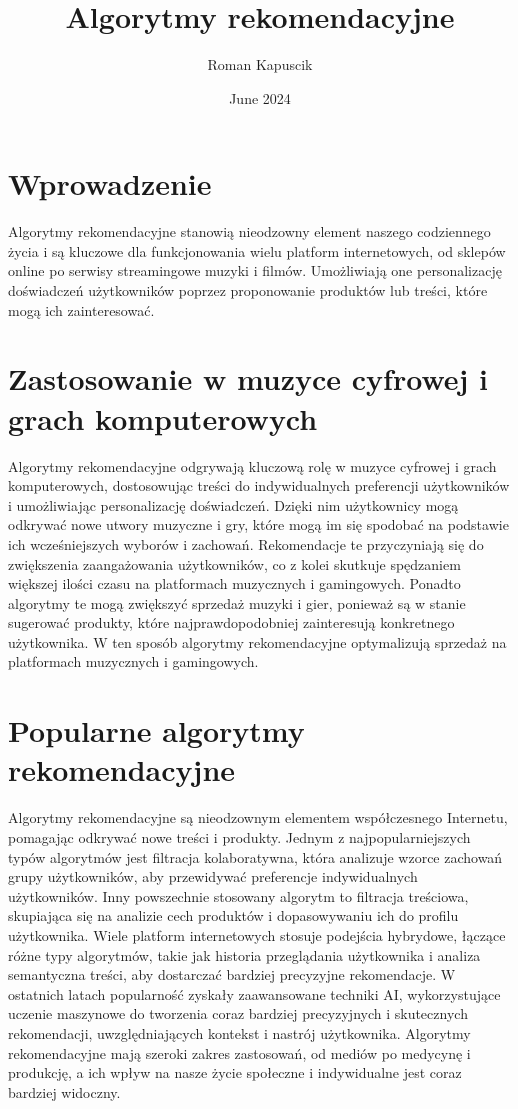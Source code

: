 \documentclass{article}
\title{Algorytmy rekomendacyjne}
\author{Roman Kapuscik}
\date{June 2024}
\begin{document}
\maketitle

\section{Wprowadzenie}
Algorytmy rekomendacyjne stanowią nieodzowny element naszego codziennego życia i są kluczowe dla funkcjonowania wielu platform internetowych, od sklepów online po serwisy streamingowe muzyki i filmów. Umożliwiają one personalizację doświadczeń użytkowników poprzez proponowanie produktów lub treści, które mogą ich zainteresować.

\section{Zastosowanie w muzyce cyfrowej i grach komputerowych}
Algorytmy rekomendacyjne odgrywają kluczową rolę w muzyce cyfrowej i grach komputerowych, dostosowując treści do indywidualnych preferencji użytkowników i umożliwiając personalizację doświadczeń. Dzięki nim użytkownicy mogą odkrywać nowe utwory muzyczne i gry, które mogą im się spodobać na podstawie ich wcześniejszych wyborów i zachowań.
Rekomendacje te przyczyniają się do zwiększenia zaangażowania użytkowników, co z kolei skutkuje spędzaniem większej ilości czasu na platformach muzycznych i gamingowych. Ponadto algorytmy te mogą zwiększyć sprzedaż muzyki i gier, ponieważ są w stanie sugerować produkty, które najprawdopodobniej zainteresują konkretnego użytkownika. W ten sposób algorytmy rekomendacyjne optymalizują sprzedaż na platformach muzycznych i gamingowych.

\section{Popularne algorytmy rekomendacyjne}
Algorytmy rekomendacyjne są nieodzownym elementem współczesnego Internetu, pomagając odkrywać nowe treści i produkty. Jednym z najpopularniejszych typów algorytmów jest filtracja kolaboratywna, która analizuje wzorce zachowań grupy użytkowników, aby przewidywać preferencje indywidualnych użytkowników. Inny powszechnie stosowany algorytm to filtracja treściowa, skupiająca się na analizie cech produktów i dopasowywaniu ich do profilu użytkownika.
Wiele platform internetowych stosuje podejścia hybrydowe, łączące różne typy algorytmów, takie jak historia przeglądania użytkownika i analiza semantyczna treści, aby dostarczać bardziej precyzyjne rekomendacje. W ostatnich latach popularność zyskały zaawansowane techniki AI, wykorzystujące uczenie maszynowe do tworzenia coraz bardziej precyzyjnych i skutecznych rekomendacji, uwzględniających kontekst i nastrój użytkownika. Algorytmy rekomendacyjne mają szeroki zakres zastosowań, od mediów po medycynę i produkcję, a ich wpływ na nasze życie społeczne i indywidualne jest coraz bardziej widoczny.
\end{document}
